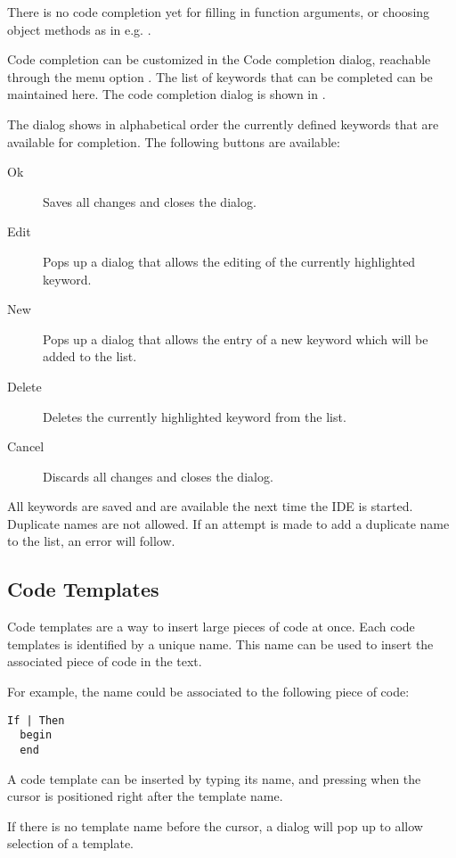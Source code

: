 There is no code completion yet for filling in function arguments, or choosing
object methods as in e.g. \delphi.

Code completion can be customized in the Code completion dialog, reachable
through the menu option .
The list of keywords that can be completed can be maintained here.
The code completion dialog is shown in .


The dialog shows in alphabetical order the currently defined keywords 
that are available for completion. The following buttons are available:
\begin{description}
\item[Ok] Saves all changes and closes the dialog.
\item[Edit] Pops up a dialog that allows the editing of the currently
highlighted keyword.
\item[New] Pops up a dialog that allows the entry of a new keyword which will be
added to the list.
\item[Delete] Deletes the currently highlighted keyword from the list.
\item[Cancel] Discards all changes and closes the dialog.
\end{description}
All keywords are saved and are available the next time the IDE is started.
Duplicate names are not allowed. If an attempt is made to add a duplicate
name to the list, an error will follow.

\subsection{Code Templates}
Code templates are a way to insert large pieces of code at once. Each
code templates is identified by a unique name. This name can be used to
insert the associated piece of code in the text.

For example, the name  could be associated to the following
piece of code:
\begin{verbatim}
If | Then
  begin
  end
\end{verbatim}
A code template can be inserted by typing its name, and pressing 
when the cursor is positioned right after the template name.

If there is no template name before the cursor, a dialog will pop up to
allow selection of a template.

